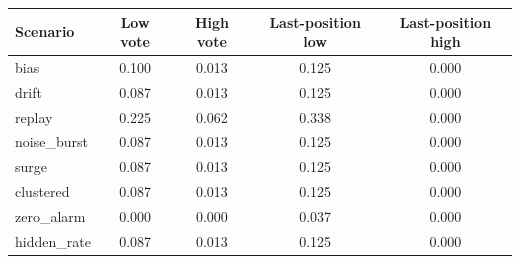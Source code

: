 \begin{tabular}{lcccc}
\toprule
Scenario & Low vote & High vote & Last-position low & Last-position high \\
\midrule
bias & 0.100 & 0.013 & 0.125 & 0.000 \\
drift & 0.087 & 0.013 & 0.125 & 0.000 \\
replay & 0.225 & 0.062 & 0.338 & 0.000 \\
noise\_burst & 0.087 & 0.013 & 0.125 & 0.000 \\
surge & 0.087 & 0.013 & 0.125 & 0.000 \\
clustered & 0.087 & 0.013 & 0.125 & 0.000 \\
zero\_alarm & 0.000 & 0.000 & 0.037 & 0.000 \\
hidden\_rate & 0.087 & 0.013 & 0.125 & 0.000 \\
\bottomrule
\end{tabular}

